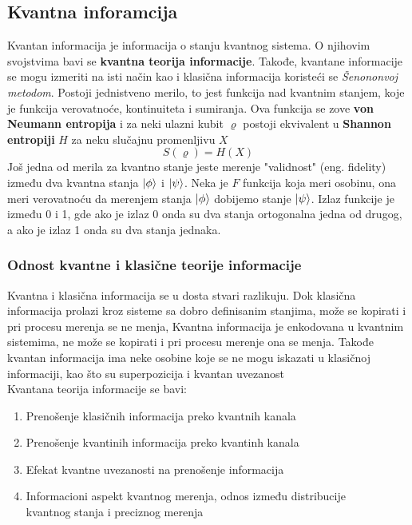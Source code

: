 \documentclass[12pt, letterpaper, oneside]{article}
\begin{document}
\subsection{Kvantna inforamcija}
Kvantan informacija je informacija o stanju kvantnog sistema. O njihovim svojstvima bavi se \textbf{kvantna teorija informacije}.
Takođe, kvantane informacije se mogu izmeriti na isti način kao i klasična informacija koristeći se \textit{Šenononvoj metodom}. 
Postoji jednistveno merilo, to jest funkcija nad kvantnim stanjem, koje je funkcija verovatnoće, kontinuiteta i sumiranja.\cite{vlatko_v}
Ova funkcija se zove \textbf{von Neumann entropija} i za neki ulazni kubit $\varrho$ postoji ekvivalent u  \textbf{Shannon entropiji} $H$
za neku slučajnu promenljivu $X$
\[
    S(\varrho) = H(X)
\]
Još jedna od merila za kvantno stanje jeste merenje "validnost" (eng. fidelity) između dva kvantna stanja $\ket{\phi}$ i $\ket{\psi}$.
Neka je $F$ funkcija koja meri osobinu, ona meri verovatnoću da merenjem stanja $\ket{\phi}$ dobijemo stanje $\ket{\psi}$.
Izlaz funkcije je između 0 i 1, gde ako je izlaz 0 onda su dva stanja ortogonalna jedna od drugog, a ako je izlaz 1 onda su dva stanja jednaka.\cite{vlatko_v}
\subsubsection*{Odnost kvantne i klasične teorije informacije}
Kvantna i klasična informacija se u dosta stvari razlikuju. Dok klasična informacija prolazi kroz sisteme sa dobro definisanim stanjima, može se kopirati i pri procesu merenja se ne menja,
Kvantna informacija je enkodovana u kvantnim sistemima, ne može se kopirati i pri procesu merenje ona se menja. Takođe kvantan informacija ima neke osobine koje se ne
mogu iskazati u klasičnoj informaciji, kao što su superpozicija i kvantan uvezanost \cite{Classical&quantum_info} \\
Kvantana teorija informacije se bavi: 
\begin{enumerate}
    \item Prenošenje klasičnih informacija preko kvantnih kanala
    \item Prenošenje kvantinih informacija preko kvantinh kanala
    \item Efekat kvantne uvezanosti na prenošenje informacija
    \item Informacioni aspekt kvantnog merenja, odnos između distribucije \\
    kvantnog stanja i preciznog merenja
\end{enumerate}
\end{document}
